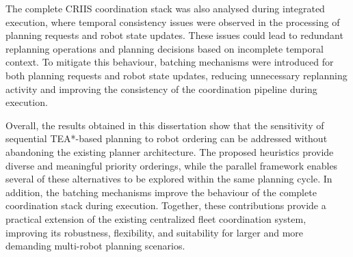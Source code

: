 The complete CRIIS coordination stack was also analysed during integrated execution, where
temporal consistency issues were observed in the processing of planning requests and robot state
updates. These issues could lead to redundant replanning operations and planning decisions based on
incomplete temporal context. To mitigate this behaviour, batching mechanisms were introduced for
both planning requests and robot state updates, reducing unnecessary replanning activity and
improving the consistency of the coordination pipeline during execution.

Overall, the results obtained in this dissertation show that the sensitivity of sequential TEA*-based
planning to robot ordering can be addressed without abandoning the existing planner architecture.
The proposed heuristics provide diverse and meaningful priority orderings, while the parallel
framework enables several of these alternatives to be explored within the same planning cycle. In
addition, the batching mechanisms improve the behaviour of the complete coordination stack during
execution. Together, these contributions provide a practical extension of the existing centralized
fleet coordination system, improving its robustness, flexibility, and suitability for larger and more
demanding multi-robot planning scenarios.